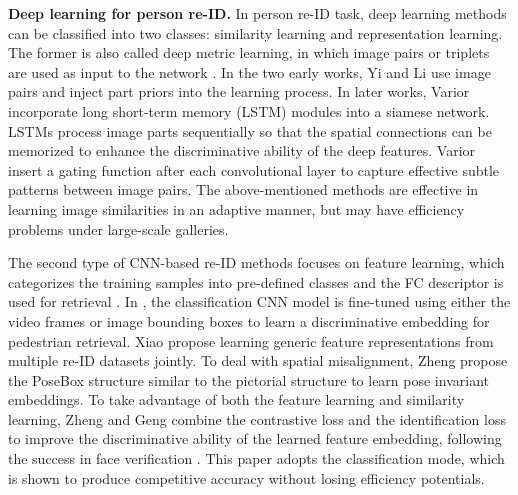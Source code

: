 \documentclass[10pt,twocolumn,letterpaper]{article}
\begin{document}
\textbf{Deep learning for person re-ID.} In person re-ID task, deep learning methods can be classified into two classes: similarity learning and representation learning. The former is also called deep metric learning, in which image pairs or triplets are used as input to the network \cite{DBLP:conf/eccv/VariorSLXW16,DBLP:conf/eccv/VariorHW16,DBLP:conf/cvpr/AhmedJM15,DBLP:conf/cvpr/LiZXW14,cheng2016person,DBLP:conf/eccv/Shi2016Embedding}. In the two early works, Yi \etal \cite{yi2014deep} and Li \etal \cite{DBLP:conf/cvpr/LiZXW14} use image pairs and inject part priors into the learning process. In later works, Varior \etal \cite{DBLP:conf/eccv/VariorSLXW16} incorporate long short-term memory (LSTM) modules into a siamese network. LSTMs process image parts sequentially so that the spatial connections can be memorized
to enhance the discriminative ability of the deep features. Varior \etal \cite{DBLP:conf/eccv/VariorHW16}  insert a gating function after each convolutional layer to capture effective subtle patterns between image pairs. The above-mentioned methods are effective in learning image similarities in an adaptive manner, but may have efficiency problems under large-scale galleries.

The second type of CNN-based re-ID methods focuses on feature learning, which categorizes the training samples into pre-defined classes and the FC descriptor is used for retrieval \cite{DBLP:journals/corr/ZhengYH16,su2016deep,DBLP:conf/cvpr/XiaoLOW16}.  In \cite{DBLP:journals/corr/ZhengYH16,zheng2016person}, the classification CNN model is fine-tuned using either the video frames or image bounding boxes to learn a discriminative embedding for pedestrian retrieval.  Xiao \etal \cite{DBLP:conf/cvpr/XiaoLOW16} propose learning generic feature representations from multiple re-ID datasets jointly. To deal with spatial misalignment, Zheng \etal \cite{DBLP:journals/corr/ZhengHLY17} propose the PoseBox structure similar to the pictorial structure \cite{cheng2011custom} to learn pose invariant embeddings. To take advantage of both the feature learning and similarity learning, Zheng \etal \cite{DBLP:journals/corr/ZhengZY16} and Geng \etal \cite{geng2016deep}  combine the contrastive loss and the identification loss to improve the discriminative ability of the learned feature embedding, following the success in face verification \cite{sun2014deep}. This paper adopts the classification mode, which is shown to produce competitive accuracy without losing efficiency potentials.
\end{document}
